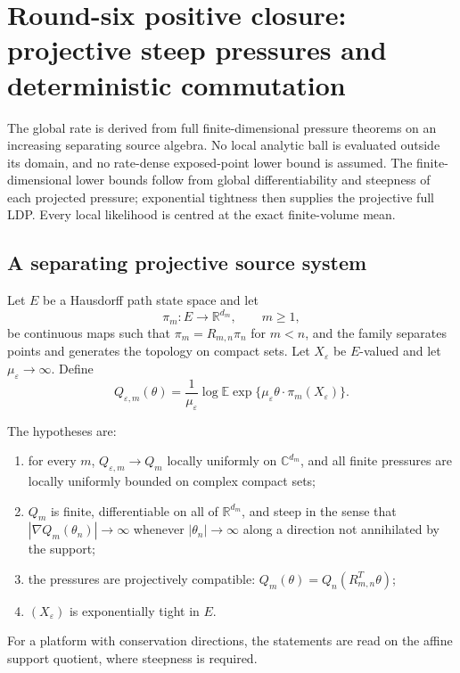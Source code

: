 \section{Round-six positive closure: projective steep pressures and deterministic commutation}
\label{sec:r6-d1}

The global rate is derived from full finite-dimensional pressure theorems on an
increasing separating source algebra.  No local analytic ball is evaluated
outside its domain, and no rate-dense exposed-point lower bound is assumed.
The finite-dimensional lower bounds follow from global differentiability and
steepness of each projected pressure; exponential tightness then supplies the
projective full LDP.  Every local likelihood is centred at the exact
finite-volume mean.

\subsection{A separating projective source system}

Let \(E\) be a Hausdorff path state space and let
\[
\pi_m:E\longrightarrow\mathbb R^{d_m},
\qquad m\ge1,
\]
be continuous maps such that \(\pi_m=R_{m,n}\pi_n\) for \(m<n\), and the
family separates points and generates the topology on compact sets.  Let
\(X_\varepsilon\) be \(E\)-valued and let
\(\mu_\varepsilon\to\infty\).  Define
\[
Q_{\varepsilon,m}(\theta)=
\frac1{\mu_\varepsilon}\log
\mathbb E
\exp\{\mu_\varepsilon\theta\cdot\pi_m(X_\varepsilon)\}.
\]

The hypotheses are:
\begin{enumerate}[label=(P\arabic*)]
\item for every \(m\), \(Q_{\varepsilon,m}\to Q_m\) locally uniformly on
\(\mathbb C^{d_m}\), and all finite pressures are locally uniformly bounded
on complex compact sets;
\item \(Q_m\) is finite, differentiable on all of \(\mathbb R^{d_m}\), and
steep in the sense that
\(|\nabla Q_m(\theta_n)|\to\infty\) whenever
\(|\theta_n|\to\infty\) along a direction not annihilated by the support;
\item the pressures are projectively compatible:
\(Q_m(\theta)=Q_n(R_{m,n}^T\theta)\);
\item \((X_\varepsilon)\) is exponentially tight in \(E\).
\end{enumerate}
For a platform with conservation directions, the statements are read on the
affine support quotient, where steepness is required.

